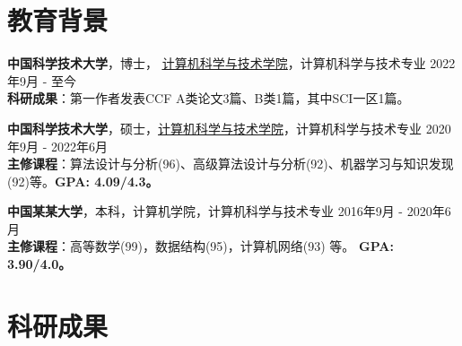     \section{\makebox[\widthof{\faGraduationCap}][c]{\color{USTC_Blue}{\faGraduationCap}}\quad 教育背景}


    {\large \textbf{中国科学技术大学}}，博士， \href{https://cs.ustc.edu.cn/}{\underline{计算机科学与技术学院}}，计算机科学与技术专业 \hfill {2022年9月 - 至今} \\
    \textbf{科研成果}：第一作者发表CCF A类论文3篇、B类1篇，其中SCI一区1篇。
    
    \vspace{0.5em}
    {\large \textbf{中国科学技术大学}}，硕士，\href{https://cs.ustc.edu.cn/}{\underline{计算机科学与技术学院}}，计算机科学与技术专业 \hfill {2020年9月 - 2022年6月} \\
    \textbf{主修课程}：算法设计与分析(96)、高级算法设计与分析(92)、机器学习与知识发现(92)等。\textbf{GPA: 4.09/4.3。}

    \vspace{0.5em}
    {\large \textbf{中国某某大学}}，本科，计算机学院，计算机科学与技术专业 \hfill {2016年9月 - 2020年6月} \\
    \textbf{主修课程}：高等数学(99)，数据结构(95)，计算机网络(93) 等。 \textbf{GPA: 3.90/4.0。}


    \section{\makebox[\widthof{\faGraduationCap}][c]{\color{USTC_Blue}{\faPaperclip}}\quad 科研成果}

